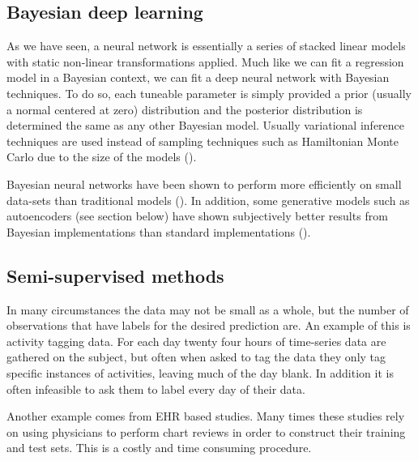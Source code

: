\documentclass[]{book}
\theoremstyle{definition}
\theoremstyle{definition}
\theoremstyle{definition}
\theoremstyle{remark}
\begin{document}
\subsection{Bayesian deep learning}\label{bayesian-deep-learning}

As we have seen, a neural network is essentially a series of stacked
linear models with static non-linear transformations applied. Much like
we can fit a regression model in a Bayesian context, we can fit a deep
neural network with Bayesian techniques. To do so, each tuneable
parameter is simply provided a prior (usually a normal centered at zero)
distribution and the posterior distribution is determined the same as
any other Bayesian model. Usually variational inference techniques are
used instead of sampling techniques such as Hamiltonian Monte Carlo due
to the size of the models (\citet{bayesnets}).

Bayesian neural networks have been shown to perform more efficiently on
small data-sets than traditional models (\citet{dropout}). In addition,
some generative models such as autoencoders (see section below) have
shown subjectively better results from Bayesian implementations than
standard implementations (\citet{variational_autoencoders}).

\subsection{Semi-supervised methods}\label{semi-supervised-methods}

In many circumstances the data may not be small as a whole, but the
number of observations that have labels for the desired prediction are.
An example of this is activity tagging data. For each day twenty four
hours of time-series data are gathered on the subject, but often when
asked to tag the data they only tag specific instances of activities,
leaving much of the day blank. In addition it is often infeasible to ask
them to label every day of their data.

Another example comes from EHR based studies. Many times these studies
rely on using physicians to perform chart reviews in order to construct
their training and test sets. This is a costly and time consuming
procedure.
\end{document}
